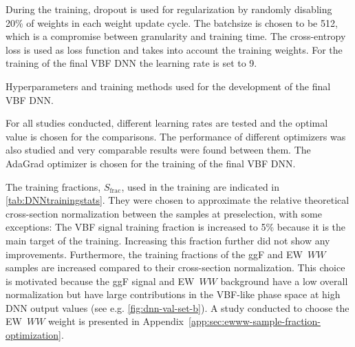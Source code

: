 During the training, dropout is used for regularization by randomly disabling 20\% of weights in each weight update cycle.
The batchsize is chosen to be 512, which is a compromise between granularity and training time.
The cross-entropy loss is used as loss function and takes into account the training weights.
For the training of the final VBF DNN the learning rate is set to 9. 
\begin{table}[h!]
    \begin{center}
        
    \end{center}
    \caption[Hyperparameters and training methods for the VBF DNN.]{Hyperparameters and training methods used for the development of the final VBF DNN.
    }
    \label{tab:DNN-info}
\end{table}
For all studies conducted, different learning rates are tested and the optimal value is chosen for the comparisons. 
The performance of different optimizers was also studied and very comparable results were found between them.
The AdaGrad optimizer is chosen for the training of the final VBF DNN.

The training fractions, $S_\text{frac}$, used in the training are indicated in \cref{tab:DNNtrainingstats}. They were chosen to approximate the relative theoretical cross-section normalization between the samples at preselection, with some exceptions: The VBF signal training fraction is increased to 5\% because it is the main target of the training. Increasing this fraction further did not show any improvements. Furthermore, the training fractions of the ggF and EW~$WW$ samples are increased compared to their cross-section normalization. 
This choice is motivated because the ggF signal and EW~$WW$ background have a low overall normalization but have large contributions in the VBF-like phase space at high DNN output values (see e.g. \cref{fig:dnn-val-set-b}). 
A study conducted to choose the EW~$WW$ weight is presented in Appendix~\ref{app:sec:ewww-sample-fraction-optimization}.

